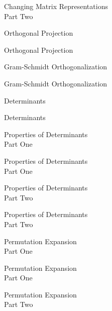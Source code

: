 \documentclass{titlescreen}
\begin{document}
\begin{videotitle}
  Changing Matrix Representations \\[1ex]
  Part Two
\end{videotitle}
\begin{videoend}
  Orthogonal Projection  
\end{videoend}


\begin{videotitle}
  Orthogonal Projection
\end{videotitle}
\begin{videoend}
  Gram-Schmidt Orthogonalization
\end{videoend}

\begin{videotitle}
  Gram-Schmidt Orthogonalization
\end{videotitle}
\begin{videoend}
  Determinants
\end{videoend}





\begin{videotitle}
  Determinants  
\end{videotitle}
\begin{videoend}
  Properties of Determinants \\[1ex]
  Part One
\end{videoend}

\begin{videotitle}
  Properties of Determinants \\[1ex]
  Part One
\end{videotitle}
\begin{videoend}
  Properties of Determinants \\[1ex]
  Part Two
\end{videoend}

\begin{videotitle}
  Properties of Determinants \\[1ex]
  Part Two
\end{videotitle}
\begin{videoend}
  Permutation Expansion \\[1ex]
  Part One
\end{videoend}

\begin{videotitle}
  Permutation Expansion \\[1ex]
  Part One
\end{videotitle}
\begin{videoend}
  Permutation Expansion \\[1ex]
  Part Two
\end{videoend}
\end{document}
